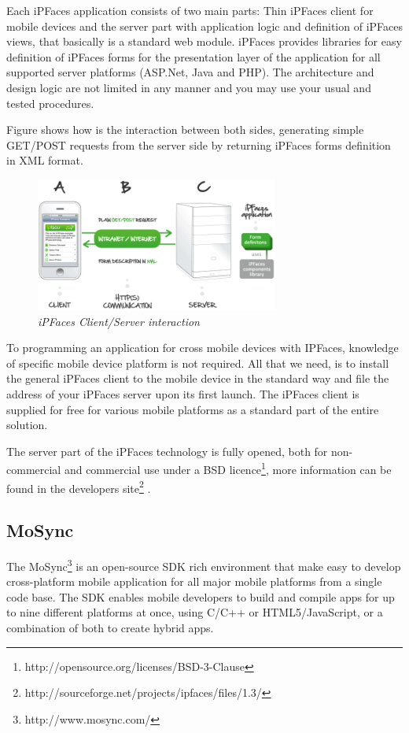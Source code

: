 \documentclass[a4paper,12pt]{book}
\begin{document}
Each iPFaces application consists of two main parts: Thin iPFaces client for mobile devices and the server part with application logic and definition of iPFaces views, that basically  is a standard web module. iPFaces provides libraries for easy definition of iPFaces forms for the presentation layer of the application for all supported server platforms (ASP.Net, Java and PHP). The architecture and design logic are not limited in any manner and you may use your usual and tested procedures. 

Figure shows how is the interaction between both sides, generating simple GET/POST requests from the server side by returning iPFaces forms definition in XML format.

\begin{figure}[H]
    \centering
    \includegraphics[width=8cm, keepaspectratio]{img/ipfaces.png}
    \caption{\textit{iPFaces Client/Server interaction}}
 \end{figure}

To programming an application for  cross mobile devices with IPFaces, knowledge of specific mobile device platform is not required.  All that we need,  is to install the general iPFaces client to the mobile device in the standard way and file the address of your iPFaces server upon its first launch. The iPFaces client is supplied for free for various mobile platforms as a standard part of the entire solution.

The server part of the iPFaces technology is fully opened, both for non-commercial and commercial use under a BSD licence\footnote{http://opensource.org/licenses/BSD-3-Clause}, more information can be found in the developers site\footnote{http://sourceforge.net/projects/ipfaces/files/1.3/} .

\subsection{MoSync}
\label{MoSync} 

The MoSync\footnote{http://www.mosync.com/}  is an open-source SDK rich environment that make easy to develop cross-platform mobile application for all major mobile platforms from a single code base. The SDK enables mobile developers to build and compile apps for up to nine different platforms at once, using C/C++ or HTML5/JavaScript, or a combination of both to create hybrid apps.
\end{document}
